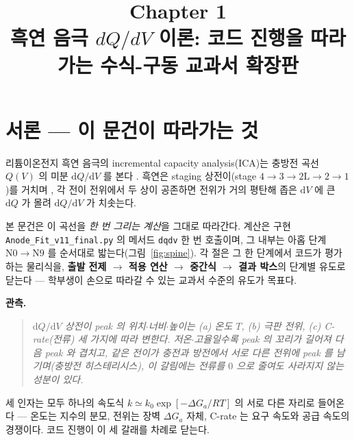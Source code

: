 \documentclass[11pt,a4paper]{article}
\title{\textbf{\LARGE Chapter 1}\\[0.35em]\Large 흑연 음극 $dQ/dV$ 이론: 코드 진행을 따라가는 수식-구동 교과서 확장판}
\author{}
\date{}
\newcommand{\dd}{\mathrm{d}}
\newcommand{\code}[1]{\texttt{#1}}
\begin{document}
\maketitle

\section*{서론 — 이 문건이 따라가는 것}
리튬이온전지 흑연 음극의 incremental capacity analysis(ICA)는 충방전 곡선 $Q(V)$ 의 미분
$\dd Q/\dd V$ 를 본다 \cite{bloom2005,dubarry2012}. 흑연은 staging 상전이(stage
$4\!\to\!3\!\to\!2\mathrm L\!\to\!2\!\to\!1$)를 거치며 \cite{dahn1991,ohzuku1993}, 각 전이 전위에서
두 상이 공존하면 전위가 거의 평탄해 좁은 $\dd V$ 에 큰 $\dd Q$ 가 몰려 $\dd Q/\dd V$ 가 치솟는다.

본 문건은 이 곡선을 \emph{한 번 그리는 계산}을 그대로 따라간다. 계산은 구현
\code{Anode\_Fit\_v11\_final.py} 의 메서드 \code{dqdv} 한 번 호출이며, 그 내부는 아홉 단계
$\mathrm N0\!\to\!\mathrm N9$ 를 순서대로 밟는다(그림~\ref{fig:spine}). 각 절은 그 한 단계에서
코드가 평가하는 물리식을, \textbf{출발 전제 $\to$ 적용 연산 $\to$ 중간식 $\to$ 결과 박스}의 단계별 유도로 닫는다 — 학부생이 손으로 따라갈 수 있는 교과서 수준의 유도가 목표다.

\textbf{관측.}
\begin{quote}\itshape
$\dd Q/\dd V$ 상전이 peak 의 위치$\cdot$너비$\cdot$높이는 (a) 온도 $T$, (b) 극판 전위, (c) C-rate(전류)
세 가지에 따라 변한다. 저온$\cdot$고율일수록 peak 의 꼬리가 길어져 다음 peak 와 겹치고, 같은 전이가 충전과 방전에서
서로 다른 전위에 peak 를 남기며(충방전 히스테리시스), 이 갈림에는 전류를 $0$ 으로 줄여도 사라지지 않는 성분이 있다.
\end{quote}

세 인자는 모두 하나의 속도식 $k\simeq k_0\exp[-\Delta G_a/RT]$ 의 서로 다른 자리로 들어온다 — 온도는 지수의 분모,
전위는 장벽 $\Delta G_a$ 자체, C-rate 는 요구 속도와 공급 속도의 경쟁이다. 코드 진행이 이 세 갈래를 차례로 닫는다.
\end{document}
